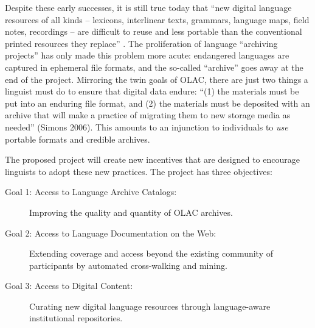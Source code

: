 
Despite these early successes, it is still true today that ``new
digital language resources of all kinds -- lexicons, interlinear
texts, grammars, language maps, field notes, recordings -- are
difficult to reuse and less portable than the conventional printed
resources they replace'' \citep{BirdSimons03language}.  The proliferation of
language ``archiving projects'' has only made this problem more
acute: endangered languages are captured in ephemeral file formats,
and the so-called ``archive'' goes away at the end of the project.
Mirroring the twin goals of OLAC, there are just two things a linguist
must do to ensure that digital data endure: ``(1) the materials must be
put into an enduring file format, and (2) the materials must be
deposited with an archive that will make a practice of migrating them
to new storage media as needed'' (Simons 2006).  This amounts to an
injunction to individuals to \emph{use} portable formats and credible
archives.

The proposed project will create new incentives that are designed to
encourage linguists to adopt these new practices.  The project has
three objectives:

\begin{description}
  \item[Goal 1: Access to Language Archive Catalogs:]
    Improving the quality and quantity of OLAC archives.

  \item[Goal 2: Access to Language Documentation on the Web:]
    Extending coverage and access beyond the existing community of
    participants by automated cross-walking and mining.

  \item[Goal 3: Access to Digital Content:]
    Curating new digital language resources through
    language-aware institutional repositories.
\end{description}

